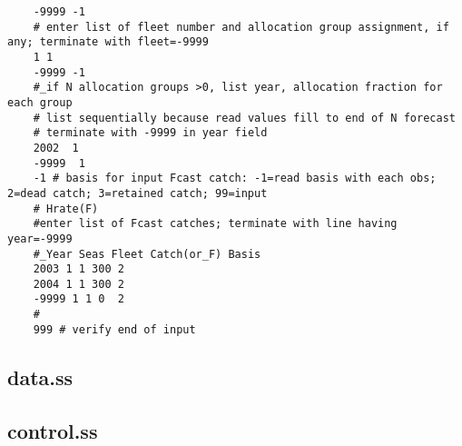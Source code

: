 \begin{landscape}
\begin{verbatim}
	-9999 -1
	# enter list of fleet number and allocation group assignment, if any; terminate with fleet=-9999
	1 1
	-9999 -1
	#_if N allocation groups >0, list year, allocation fraction for each group 
	# list sequentially because read values fill to end of N forecast
	# terminate with -9999 in year field 
	2002  1
	-9999  1 
	-1 # basis for input Fcast catch: -1=read basis with each obs; 2=dead catch; 3=retained catch; 99=input
	# Hrate(F)
	#enter list of Fcast catches; terminate with line having year=-9999
	#_Year Seas Fleet Catch(or_F) Basis 
	2003 1 1 300 2
	2004 1 1 300 2
	-9999 1 1 0  2 
	#
	999 # verify end of input 
\end{verbatim}

\subsection{data.ss}

\subsection{control.ss}

\end{landscape}
